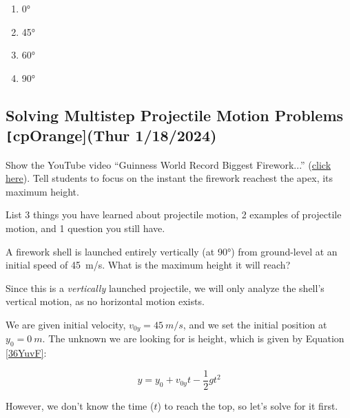 \documentclass[main-physics.tex]{subfiles}
\begin{document}
\begin{enumerate}[label=\Alph*.]
    \item \ang{0}
    \item \ang{45}
    \item \ang{60}
    \item \ang{90}
\end{enumerate}

\subsection{Solving Multistep Projectile Motion Problems \texttt[cpOrange]{(Thur 1/18/2024)}} \label{qsDlGa}

\begin{hook}
    Show the YouTube video ``Guinness World Record Biggest Firework...'' (\href{https://youtu.be/ZyjKbx36k90}{click here}). Tell students to focus on the instant the firework reachest the apex, its maximum height.
\end{hook}

\begin{warmup}
    List 3 things you have learned about projectile motion, 2 examples of projectile motion, and 1 question you still have.
\end{warmup}

\begin{example}
    A firework shell is launched entirely vertically (at \ang{90}) from ground-level at an initial speed of \SI{45}{m/s}. What is the maximum height it will reach?
\end{example}

\Solution
Since this is a \textit{vertically} launched projectile, we will only analyze the shell's vertical motion, as no horizontal motion exists. 

\vspace{1em}


We are given initial velocity, $v_{0y} = \SI{45}{m/s}$, and we set the initial position at $y_0 = \SI{0}{m}$. The unknown we are looking for is height, which is given by Equation \eqref{36YuvF}:

\begin{equation*}
    y = y_0 + v_{0y}t - \frac{1}{2} g t^2
\end{equation*}

However, we don't know the time ($t$) to reach the top, so let's solve for it first. 

\vspace{1em}
\end{document}

